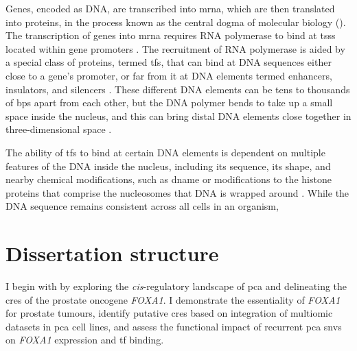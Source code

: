 Genes, encoded as DNA, are transcribed into \gls{mrna}, which are then translated into proteins, in the process known as the central dogma of molecular biology \cite{albertsMolecularBiologyCell2015} ().
The transcription of genes into \gls{mrna} requires RNA polymerase to bind at \glspl{tss} located within gene promoters \cite{goodrichUnexpectedRolesCore2010}.
The recruitment of RNA polymerase is aided by a special class of proteins, termed \glspl{tf}, that can bind at DNA sequences either close to a gene's promoter, or far from it at DNA elements termed enhancers, insulators, and silencers \cite{schoenfelderLongrangeEnhancerPromoter2019,spitzTranscriptionFactorsEnhancer2012,ongEnhancerFunctionNew2011,anderssonDeterminantsEnhancerPromoter2020,gasznerInsulatorsExploitingTranscriptional2006,oudelaarRelationshipGenomeStructure2020}.
These different DNA elements can be tens to thousands of \glspl{bp} apart from each other, but the DNA polymer bends to take up a small space inside the nucleus, and this can bring distal DNA elements close together in three-dimensional space \cite{finnMolecularBasisBiological2019,zhouChartingHistoneModifications2011}.


The ability of \glspl{tf} to bind at certain DNA elements is dependent on multiple features of the DNA inside the nucleus, including its sequence, its shape, and nearby chemical modifications, such as \gls{dname} or modifications to the histone proteins that comprise the nucleosomes that DNA is wrapped around \cite{zhuTranscriptionFactorsReaders2016,fureyChIPSeqNew2012,carterEpigeneticBasisCellular2021}.
While the DNA sequence remains consistent across all cells in an organism,

\subsection{}

\section{Dissertation structure}

I begin with  by exploring the \emph{cis}-regulatory landscape of \gls{pca} and delineating the \glspl{cre} of the prostate oncogene \emph{FOXA1}.
I demonstrate the essentiality of \emph{FOXA1} for prostate tumours, identify putative \glspl{cre} based on integration of multiomic datasets in \gls{pca} cell lines, and assess the functional impact of recurrent \gls{pca} \glspl{snv} on \emph{FOXA1} expression and \gls{tf} binding.

